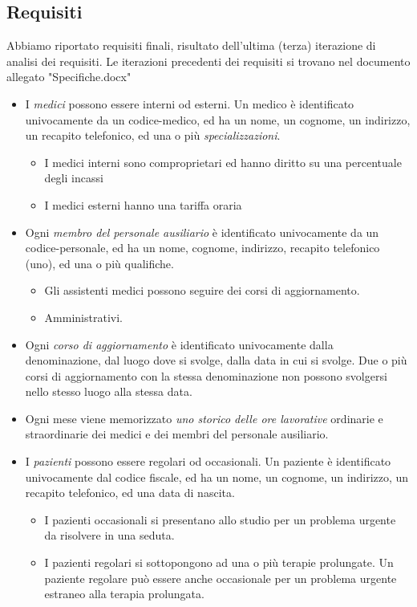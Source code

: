 \documentclass[11pt]{article}
\begin{document}
\subsection{Requisiti}
Abbiamo riportato requisiti finali, risultato dell'ultima (terza) iterazione di analisi dei requisiti.
Le iterazioni precedenti dei requisiti si trovano nel documento allegato "Specifiche.docx"
\begin{itemize}
    \item I \emph{medici} possono essere interni od esterni. Un medico è identificato univocamente da un codice-medico, ed ha un nome, un cognome, un indirizzo, un recapito telefonico, ed una o più \emph{specializzazioni}.
    \begin{itemize}
        \item I medici interni sono comproprietari ed hanno diritto su una percentuale degli incassi
        \item I medici esterni hanno una tariffa oraria
    \end{itemize}
    \item Ogni \emph{membro del personale ausiliario} è identificato univocamente da un codice-personale, ed ha un nome, cognome, indirizzo, recapito telefonico (uno), ed una o più qualifiche.
    \begin{itemize}
        \item Gli assistenti medici possono seguire dei corsi di aggiornamento.
        \item Amministrativi.
    \end{itemize}
    \item Ogni \emph{corso di aggiornamento} è identificato univocamente dalla denominazione, dal luogo dove si svolge, dalla data in cui si svolge. Due o più corsi di aggiornamento con la stessa denominazione non possono svolgersi nello stesso luogo alla stessa data.
    \item Ogni mese viene memorizzato \emph{uno storico delle ore lavorative} ordinarie e straordinarie dei medici e dei membri del personale ausiliario.
    \item I \emph{pazienti} possono essere regolari od occasionali. Un paziente è identificato univocamente dal codice fiscale, ed ha un nome, un cognome, un indirizzo, un recapito telefonico, ed una data di nascita.
    \begin{itemize}
        \item I pazienti occasionali si presentano allo studio per un problema urgente da risolvere in una seduta.
        \item I pazienti regolari si sottopongono ad una o più terapie prolungate. Un paziente regolare può essere anche occasionale per un problema urgente estraneo alla terapia prolungata.

\end{itemize}
\end{itemize}
\end{document}
